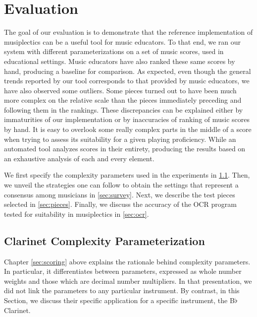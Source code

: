 \documentclass[12pt]{report}
\begin{document}
\chapter{Evaluation} 
\label{sec:eval}

The goal of our evaluation is to demonstrate that the reference implementation of musiplectics can be a useful tool for music educators. To that end, we ran our system with different parameterizations on a set of music scores, used in educational settings. Music educators have also ranked these same scores by hand, producing a baseline for comparison. As expected, even though the general trends reported by our tool corresponds to that provided by music educators, we have also observed some outliers. Some pieces turned out to have been much more complex on the relative scale than the pieces immediately preceding and following them in the rankings. These discrepancies can be explained either by immaturities of our implementation or by inaccuracies of ranking of music scores by hand. It is easy to overlook some really complex parts in the middle of a score when trying to assess its suitability for a given playing proficiency. While an automated tool analyzes scores in their entirety, producing the results based on an exhaustive analysis of each and every element.

We first specify the complexity parameters used in the experiments in \ref{sec:settings}. Then, we unveil the strategies one can follow to obtain the settings that represent a consensus among musicians in \ref{sec:survey}. Next, we describe the test pieces selected in \ref{sec:pieces}. Finally, we discuss the accuracy of the OCR program tested for suitability in musiplectics in \ref{sec:ocr}.


\section{Clarinet Complexity Parameterization} 
\label{sec:settings}

Chapter \ref{sec:scoring} above explains the rationale behind complexity parameters. In particular, it differentiates between parameters, expressed as whole number weights and those which are decimal number multipliers. In that presentation, we did not link the parameters to any particular instrument. By contrast, in this Section, we discuss their specific application for a specific instrument, the B$\flat$ Clarinet.
\end{document}
